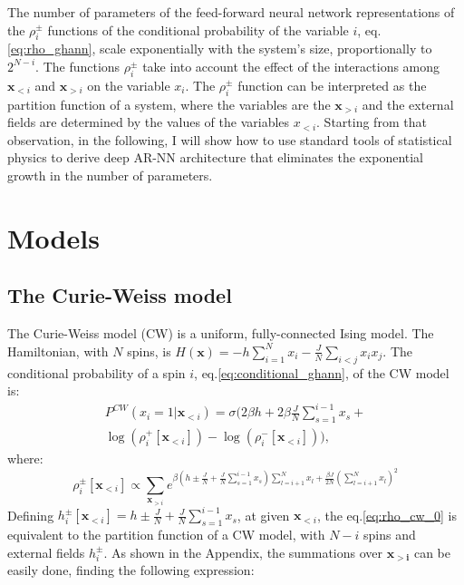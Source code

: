 \documentclass[aps,physrev,10pt,floatfix,reprint]{revtex4-2}
\begin{document}
The number of parameters of the feed-forward neural network representations of the $\rho_i^{\pm}$ functions of the conditional probability of the variable $i$, eq.\ref{eq:rho_ghann}, scale exponentially with the system's size, proportionally to $2^{N-i}$. 
The functions $\rho_i^{\pm}$ take into account the effect of the interactions among $\mathbf{x}_{<i}$ and $\mathbf{x}_{>i}$ on the variable $x_i$. 
The $\rho_i^{\pm}$ function can be interpreted as the partition function of a system, where the variables are the $\mathbf{x}_{>i}$ and the external fields are determined by the values of the variables $x_{<i}$.
Starting from that observation, in the following, I will show how to use standard tools of statistical physics to derive deep AR-NN architecture that eliminates the exponential growth in the number of parameters.  \\

\section{Models}
\subsection{The Curie-Weiss model}

The Curie-Weiss model (CW) is a uniform, fully-connected Ising model. The Hamiltonian, with $N$ spins, is $H\left(\mathbf{x}\right)=-h\sum_{i=1}^{N}x_{i}-\frac{J}{N}\sum_{i<j}x_{i}x_{j}$. The conditional probability of a spin $i$, eq.\ref{eq:conditional_ghann}, of the CW model is:
\begin{multline}
P^{CW}\left(x_{i}=1|\mathbf{x}_{<i}\right) = 
\sigma\bigg( 
 2 \beta h + 2 \beta \frac{J}{N}\sum_{s=1}^{i-1}x_{s} + \\
 \log(\rho_i^+[\mathbf{x}_{<i}]) - \log(\rho_i^-[\mathbf{x}_{<i}])
\bigg),
\label{eq:conditional_cw}
\end{multline}
where:
\begin{equation}
\rho_i^{\pm}[\mathbf{x}_{<i}] \propto \sum_{\mathbf{x}_{>i}}e^{\beta \left(h\pm\frac{J}{N}+\frac{J}{N}\sum_{s=1}^{i-1}x_{s}\right)\sum_{l=i+1}^{N}x_{l}+\frac{\beta J}{2N}(\sum_{l=i+1}^{N}x_{l})^{2}} 
\label{eq:rho_cw_0}
\end{equation}
Defining $h_i^{\pm}[\mathbf{x}_{<i}] =h\pm\frac{J}{N}+\frac{J}{N}\sum_{s=1}^{i-1}x_{s}$, at given $\mathbf{x}_{<i}$, the eq.\ref{eq:rho_cw_0} is equivalent to the partition function of a CW model, with $N-i$ spins and external fields $h_i^{\pm}$. 
As shown in the Appendix, the summations over $\mathbf{x_{>i}}$ can be easily done, finding the following expression:
\end{document}
